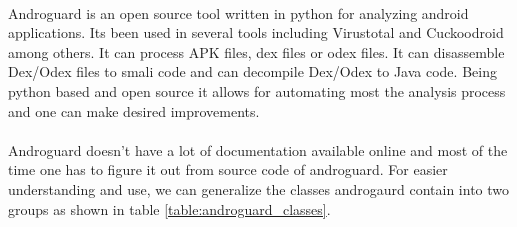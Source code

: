 \documentclass[../main.tex]{subfile}
\begin{document}
		\paragraph{} Androguard is an open source tool written in python for analyzing android applications. Its been used in several tools including Virustotal and Cuckoodroid among others. It can process APK files, dex files or odex files. It can disassemble Dex/Odex files to smali code and can decompile Dex/Odex to Java code. Being python based and open source it allows for automating most the analysis process and one can make desired improvements.
		
		\paragraph{} Androguard doesn't have a lot of documentation available online and most of the time one has to figure it out from source code of androguard. For easier understanding and use, we can generalize the classes androgaurd contain into two groups as shown in table \ref{table:androguard_classes}.
				
\end{document}
